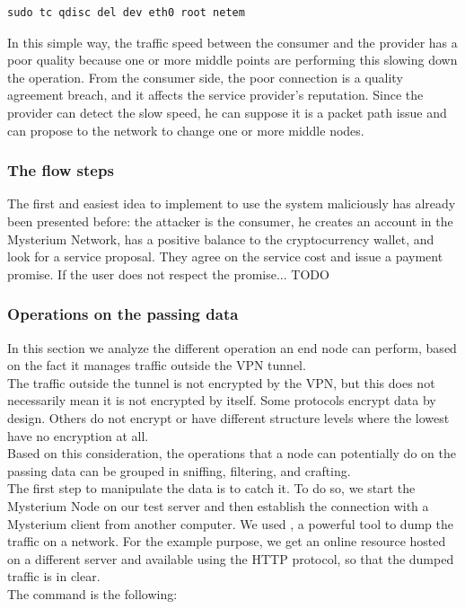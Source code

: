 \documentclass[12pt]{article}
\begin{document}
	\begin{lstlisting}[frame=single]
		sudo tc qdisc del dev eth0 root netem
	\end{lstlisting}

	In this simple way, the traffic speed between the consumer and the provider has a poor quality because one or more middle points are performing this slowing down the operation. From the consumer side, the poor connection is a quality agreement breach, and it affects the service provider's reputation. Since the provider can detect the slow speed, he can suppose it is a packet path issue and can propose to the network to change one or more middle nodes. 

	\subsubsection{The flow steps}
	The first and easiest idea to implement to use the system maliciously has already been presented before: the attacker is the consumer, he creates an account in the Mysterium Network, has a positive balance to the cryptocurrency wallet, and look for a service proposal. They agree on the service cost and issue a payment promise. If the user does not respect the promise...
	TODO\\

	\subsubsection{Operations on the passing data}

	In this section we analyze the different operation an end node can perform, based on the fact it manages traffic outside the VPN tunnel.\\
	The traffic outside the tunnel is not encrypted by the VPN, but this does not necessarily mean it is not encrypted by itself. Some protocols encrypt data by design. Others do not encrypt or have different structure levels where the lowest have no encryption at all.\\ Based on this consideration, the operations that a node can potentially do on the passing data can be grouped in sniffing, filtering, and crafting.\\
	The first step to manipulate the data is to catch it. To do so, we start the Mysterium Node on our test server and then establish the connection with a Mysterium client from another computer. We used , a powerful tool to dump the traffic on a network. For the example purpose, we get an online resource hosted on a different server and available using the HTTP protocol, so that the dumped traffic is in clear.\\
	The command is the following:\\
	
\end{document}
